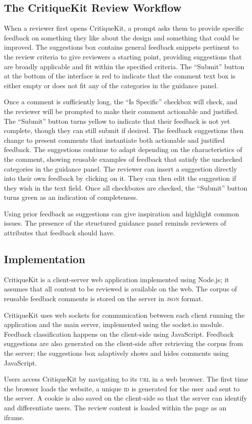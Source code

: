 \subsection{The CritiqueKit Review Workflow}
When a reviewer first opens CritiqueKit, a prompt asks them to provide specific feedback on something they like about the design and something that could be improved. The suggestions box contains general feedback snippets \cite{kulkarni2013peer} pertinent to the review criteria to give reviewers a starting point, providing suggestions that are broadly applicable and fit within the specified criteria. The ``Submit'' button at the bottom of the interface is red to indicate that the comment text box is either empty or does not fit any of the categories in the guidance panel. 

Once a comment is sufficiently long, the ``Is Specific'' checkbox will check, and the reviewer will be prompted to make their comment actionable and justified. The ``Submit'' button turns yellow to indicate that their feedback is not yet complete, though they can still submit if desired. The feedback suggestions then change to present comments that instantiate both actionable and justified feedback. The suggestions continue to adapt depending on the characteristics of the comment, showing reusable examples of feedback that satisfy the unchecked categories in the guidance panel. The reviewer can insert a suggestion directly into their own feedback by clicking on it. They can then edit the suggestion if they wish in the text field. Once all checkboxes are checked, the ``Submit'' button turns green as an indication of completeness. 

Using prior feedback as suggestions can give inspiration and highlight common issues. The presence of the structured guidance panel reminds reviewers of attributes that feedback should have. 

\subsection{Implementation}
CritiqueKit is a client-server web application implemented using Node.js; it assumes that all content to be reviewed is available on the web. The corpus of reusable feedback comments is stored on the server in \textsc{json} format.

CritiqueKit uses web sockets for communication between each client running the application and the main server, implemented using the socket.io module. Feedback classification happens on the client-side using JavaScript. Feedback suggestions are also generated on the client-side after retrieving the corpus from the server; the suggestions box adaptively shows and hides comments using JavaScript. 

Users access CritiqueKit by navigating to its \textsc{url} in a web browser. The first time the browser loads the website, a unique \textsc{id} is generated for the user and sent to the server. A cookie is also saved on the client-side so that the server can identify and differentiate users. The review content is loaded within the page as an iframe.
